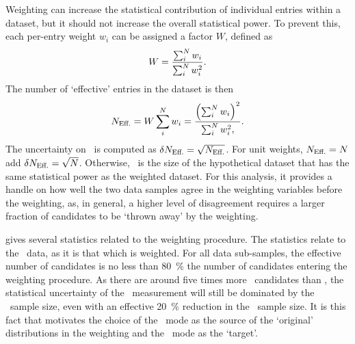 Weighting can increase the statistical contribution of individual entries 
within a dataset, but it should not increase the overall statistical power.
To prevent this, each per-entry weight $w_{i}$ can be assigned a factor $W$, 
defined as
\begin{equation}
  W = \frac{%
    \sum_{i}^{N} w_{i}
  }{%
    \sum_{i}^{N} w_{i}^{2}
  }.
\end{equation}
The number of `effective' entries in the dataset is then
\begin{equation}
  \neff = W\sum_{i}^{N} w_{i} = \frac{%
    {\left(\sum_{i}^{N}{w_{i}}\right)}^{2}
  }{%
    \sum_{i}^{N}{w_{i}^{2}},
  }.
\end{equation}
The uncertainty on \neff\ is computed as $\delta{\ensuremath{N_{\text{Eff.}}}} = \sqrt{N_{\text{Eff.}}}$.
For unit weights, $N_{\text{Eff.}} = N$ add $\delta{\ensuremath{N_{\text{Eff.}}}} = \sqrt{N}$.
Otherwise, \neff\ is the size of the hypothetical dataset that has the same 
statistical power as the weighted dataset.
For this analysis, it provides a handle on how well the two data samples agree 
in the weighting variables before the weighting, as, in general, a higher level 
of disagreement requires a larger fraction of candidates to be `thrown away' by 
the weighting.

 gives several statistics 
related to the weighting procedure.
The statistics relate to the \ppipi\ data, as it is that which is weighted.
For all data sub-samples, the effective number of candidates is no less than 
\SI{80}{\percent} the number of candidates entering the weighting procedure.
As there are around five times more \ppipi\ candidates than \pKK, the 
statistical uncertainty of the \dACP\ measurement will still be dominated by 
the \pKK\ sample size, even with an effective \SI{20}{\percent} reduction in 
the \ppipi\ sample size.
It is this fact that motivates the choice of the \ppipi\ mode as the source of 
the `original' distributions in the weighting and the \pKK\ mode as the 
`target'.

\begin{table}
  \centering
  \caption{%
    Statistics computed on the weighted \ppipi\ data for all data sub-samples 
    used in the analysis.
    The quantities are defined in \cref{chap:cpv:kinematic_weighting:stats}.
  }
  \label{tab:cpv:kinematic_weighting:validation:stats}
    
\end{table}

